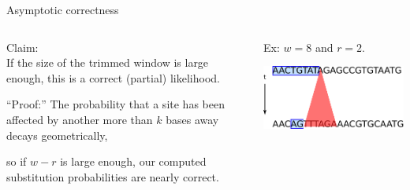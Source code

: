 \documentclass[smaller]{beamer}
\begin{document}
\begin{frame}{Asymptotic correctness}
  \begin{columns}[c]
    \begin{column}{.4\textwidth}

  {\struct Claim:} \\
  If the size of the trimmed window is large enough, this is a {\newthing correct} (partial) likelihood.

  \vspace{2em}

  {\struct ``Proof:''}
  The probability that a site has been affected by another more than $k$ bases away decays geometrically,

  \vspace{2em}

  so if $w-r$ is large enough, our computed substitution probabilities are nearly correct.

    \end{column}
    \begin{column}{.6\textwidth}

      Ex: $w=8$ and $r=2$.

  \vspace{1em}

  \includegraphics{../../../writeup-plots/talk-dependency-proof-fig}

    \end{column}
  \end{columns}

\end{frame}
\end{document}
